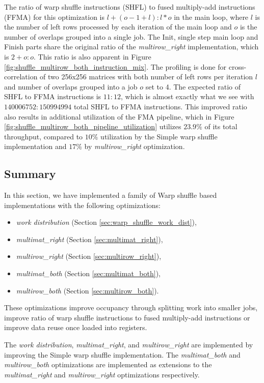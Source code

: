 The ratio of warp shuffle instructions (SHFL) to fused multiply-add instructions (FFMA) for this optimization is $l + (o - 1 + l) : l * o$ in the main loop, where $l$ is the number of left rows processed by each iteration of the main loop and $o$ is the number of overlaps grouped into a single job.  
The Init, single step main loop and Finish parts share the original ratio of the \textit{multirow\_right} implementation, which is $2 + o : o$. This ratio is also apparent in Figure \ref{fig:shuffle_multirow_both_instruction_mix}. The profiling is done for cross-correlation of two 256x256 matrices with both number of left rows per iteration $l$ and number of overlaps grouped into a job $o$ set to 4. The expected ratio of SHFL to FFMA instructions is $11:12$, which is almost exactly what we see with $140 006 752 : 150 994 994$ total SHFL to FFMA instructions. This improved ratio also results in additional utilization of the FMA pipeline, which in Figure \ref{fig:shuffle_multirow_both_pipeline_utilization} utilizes $23.9\%$ of its total throughput, compared to $10\%$ utilization by the Simple warp shuffle implementation and $17\%$ by \textit{multirow\_right} optimization.



\subsection{Summary}
\label{sec:combining_optimizations}

In this section, we have implemented a family of Warp shuffle based implementations with the following optimizations:
\begin{itemize}
	\item \textit{work distribution} (Section \ref{sec:warp_shuffle_work_dist}),
	\item \textit{multimat\_right} (Section \ref{sec:multimat_right}),
	\item \textit{multirow\_right} (Section \ref{sec:multirow_right}),
	\item \textit{multimat\_both} (Section \ref{sec:multimat_both}),
	\item \textit{multirow\_both} (Section \ref{sec:multirow_both}).
\end{itemize}

These optimizations improve occupancy through splitting work into smaller jobs, improve ratio of warp shuffle instructions to fused multiply-add instructions or improve data reuse once loaded into registers.


The \textit{work distribution}, \textit{multimat\_right}, and \textit{multirow\_right} are implemented by improving the Simple warp shuffle implementation. The  \textit{multimat\_both} and \textit{multirow\_both} optimizations are implemented as extensions to the \textit{multimat\_right} and \textit{multirow\_right} optimizations respectively.


